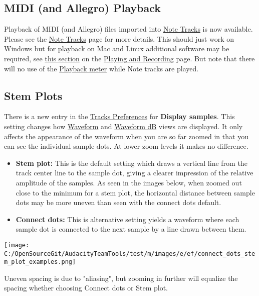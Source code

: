 \begin{multicols}{2}
\subsection{MIDI (and Allegro) Playback}Playback of MIDI (and Allegro) files imported into 
\hyperref[\foo{note_tracks_}]{Note Tracks}
 is now available.  Please see the 
\hyperref[\foo{note_tracks_}]{Note Tracks}
 page for more details.
This should just work on Windows but for playback on Mac and Linux additional software may be required, see 
\hyperref[\foo{playing_and_recording_midi}]{this section}
 on the 
\hyperref[\foo{playing_and_recording_}]{Playing and Recording}
 page.
But note that there will no use of the 
\hyperref[\foo{meter_toolbar_playback}]{Playback meter}
 while Note tracks are played. 

\label{new_features_in_this_release_stemplots}
\subsection{Stem Plots}There is a new entry in the 
\hyperref[\foo{tracks_preferences_}]{Tracks Preferences}
 for \textbf{Display samples}.  This setting changes how 
\hyperref[\foo{audacity_waveform_}]{Waveform}
 and 
\hyperref[\foo{audacity_waveform_db}]{Waveform dB}
 views are displayed.  It only affects the appearance of the waveform when you are so far zoomed in that you can see the individual sample dots.  At lower zoom levels it makes no difference.  

\begin{itemize}
\item \textbf{Stem plot:} This is the default setting which draws a vertical line from the track center line to the sample dot, giving a clearer impression of the relative amplitude of the samples. As seen in the images below, when zoomed out close to the minimum for a stem plot, the horizontal distance between sample dots may be more uneven than seen with the connect dots default.   
\item \textbf{Connect dots:} This is alternative setting yields a waveform where each sample dot is connected to the next sample by a line drawn between them.  
\end{itemize}
\par \protect\texttt{[image: C:/OpenSourceGit/AudacityTeamTools/test/m/images/e/ef/connect\_dots\_stem\_plot\_examples.png]}\par Uneven spacing is due to "aliasing", but zooming in further will equalize the spacing whether choosing Connect dots or Stem plot.
\label{new_features_in_this_release_menus}

\end{multicols}
